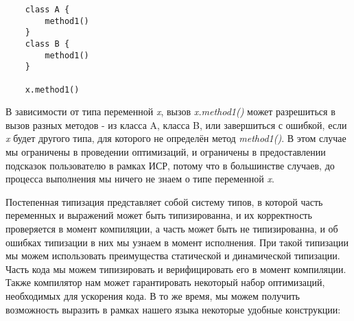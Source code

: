 \begin{verbatim}
    class A {
        method1()
    }
    class B {
        method1()
    }

    x.method1()
\end{verbatim} 

\vskip4pt


В зависимости от типа переменной \textit{x}, вызов \textit{x.method1()} может разрешиться в вызов разных методов - из класса A, класса B, или завершиться с ошибкой, если \textit{x} будет другого типа, для которого не определён метод \textit{method1()}. В этом случае мы ограничены в проведении оптимизаций, и ограничены в предоставлении подсказок пользователю в рамках ИСР, потому что в большинстве случаев, до процесса выполнения мы ничего не знаем о типе переменной \textit{x}.

Постепенная типизация представляет собой систему типов, в которой часть переменных и выражений может быть типизированна, и их корректность проверяется в момент компиляции, а часть может быть не типизированна, и об ошибках типизации в них мы узнаем в момент исполнения. При такой типизации мы можем использовать преимущества статической и динамической типизации. Часть кода мы можем типизировать и верифицировать его в момент компиляции. Также компилятор нам может гарантировать некоторый набор оптимизаций, необходимых для ускорения кода. В то же время, мы можем получить возможность выразить в рамках нашего языка некоторые удобные конструкции:


